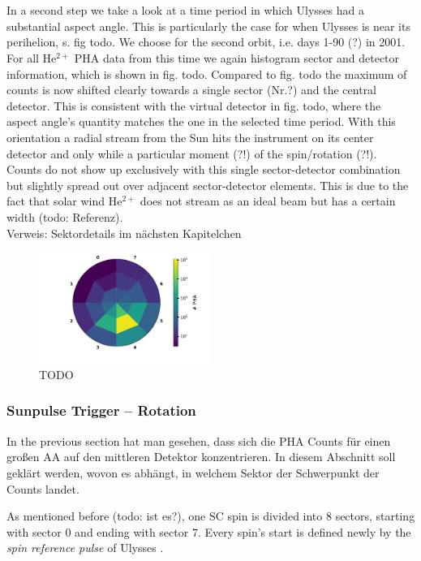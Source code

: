 \\ \\
In a second step we take a look at a time period in which Ulysses had a substantial aspect angle. This is particularly the case for when Ulysses is near its perihelion, s. fig todo. We choose for the second orbit, i.e. days 1-90 (?) in 2001. For all $\mathrm{He^{2+}}$ PHA data from this time we again histogram sector and detector information, which is shown in fig. todo. Compared to fig. todo the maximum of counts is now shifted clearly towards a single sector (Nr.?) and the central detector. This is consistent with the virtual detector in fig. todo, where the aspect angle's quantity matches the one in the selected time period. With this orientation a radial stream from the Sun hits the instrument on its center detector and only while a particular moment (?!) of the spin/rotation (?!). Counts do not show up exclusively with this single sector-detector combination but slightly spread out over adjacent sector-detector elements. This is due to the fact that solar wind $\mathrm{He^{2+}}$ does not stream as an ideal beam but has a certain width (todo: Referenz).
\\ Verweis: Sektordetails im nächsten Kapitelchen

\begin{figure}[h]
	\includegraphics[width=0.5\textwidth]{Figures/hist_det_sec_aa_90days2001}
	\centering
	\caption{TODO}
	\label{TODO}
\end{figure}


\subsubsection{Sunpulse Trigger -- Rotation}
In the previous section hat man gesehen, dass sich die PHA Counts für einen großen AA auf den mittleren Detektor konzentrieren. In diesem Abschnitt soll geklärt werden, wovon es abhängt, in welchem Sektor der Schwerpunkt der Counts landet. 

As mentioned before (todo: ist es?), one SC spin is divided into 8 sectors, starting with sector 0 and ending with sector 7.
Every spin's start is defined newly by the \textit{spin reference pulse} of Ulysses \citep{hiscale}. 

